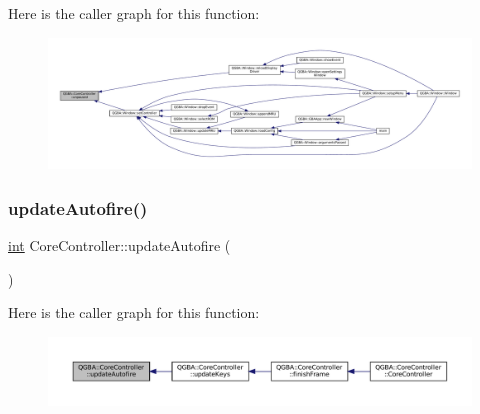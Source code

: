 Here is the caller graph for this function\+:
\nopagebreak
\begin{figure}[H]
\begin{center}
\leavevmode
\includegraphics[width=350pt]{class_q_g_b_a_1_1_core_controller_ae4f3b1896454fad0d8d963e2ae495833_icgraph}
\end{center}
\end{figure}
\mbox{\label{class_q_g_b_a_1_1_core_controller_a6c4ad6bbaba7a1d1e8aca2f29a135633}} 
\subsubsection{\texorpdfstring{update\+Autofire()}{updateAutofire()}}
{\footnotesize\ttfamily \mbox{\hyperlink{ioapi_8h_a787fa3cf048117ba7123753c1e74fcd6}{int}} Core\+Controller\+::update\+Autofire (\begin{DoxyParamCaption}{ }\end{DoxyParamCaption})\hspace{0.3cm}{\ttfamily [private]}}

Here is the caller graph for this function\+:
\nopagebreak
\begin{figure}[H]
\begin{center}
\leavevmode
\includegraphics[width=350pt]{class_q_g_b_a_1_1_core_controller_a6c4ad6bbaba7a1d1e8aca2f29a135633_icgraph}
\end{center}
\end{figure}
\mbox{\label{class_q_g_b_a_1_1_core_controller_a074cf60b510439d4e813c60f34829334}} 
